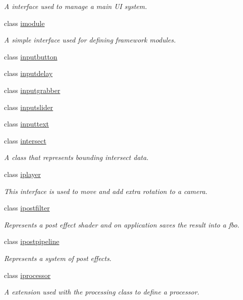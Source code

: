 \begin{DoxyCompactItemize}
\begin{DoxyCompactList}\small\item\em A interface used to manage a main UI system. \end{DoxyCompactList}\item 
class \hyperlink{classflounder_1_1imodule}{imodule}
\begin{DoxyCompactList}\small\item\em A simple interface used for defining framework modules. \end{DoxyCompactList}\item 
class \hyperlink{classflounder_1_1inputbutton}{inputbutton}
\item 
class \hyperlink{classflounder_1_1inputdelay}{inputdelay}
\item 
class \hyperlink{classflounder_1_1inputgrabber}{inputgrabber}
\item 
class \hyperlink{classflounder_1_1inputslider}{inputslider}
\item 
class \hyperlink{classflounder_1_1inputtext}{inputtext}
\item 
class \hyperlink{classflounder_1_1intersect}{intersect}
\begin{DoxyCompactList}\small\item\em A class that represents bounding intersect data. \end{DoxyCompactList}\item 
class \hyperlink{classflounder_1_1iplayer}{iplayer}
\begin{DoxyCompactList}\small\item\em This interface is used to move and add extra rotation to a camera. \end{DoxyCompactList}\item 
class \hyperlink{classflounder_1_1ipostfilter}{ipostfilter}
\begin{DoxyCompactList}\small\item\em Represents a post effect shader and on application saves the result into a fbo. \end{DoxyCompactList}\item 
class \hyperlink{classflounder_1_1ipostpipeline}{ipostpipeline}
\begin{DoxyCompactList}\small\item\em Represents a system of post effects. \end{DoxyCompactList}\item 
class \hyperlink{classflounder_1_1iprocessor}{iprocessor}
\begin{DoxyCompactList}\small\item\em A extension used with the processing class to define a processor. \end{DoxyCompactList}\item 

\end{DoxyCompactItemize}
